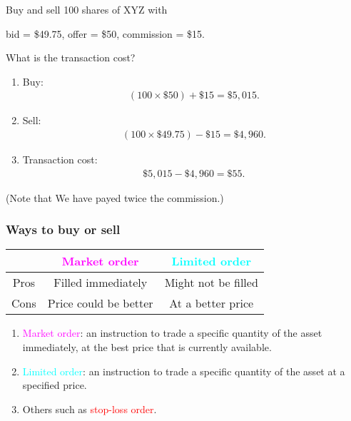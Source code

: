 \begin{frame}[fragile,t]
	\begin{myexample}
		 Buy and sell 100 shares of XYZ with
		 \begin{center}
		 	 bid = \$49.75, \quad  offer = \$50, \quad  commission = \$15.
		 \end{center}
		 What is the transaction cost?
	\end{myexample}
	\bigskip
	\pause

	\begin{mysol}
		\begin{enumerate}
			\item Buy:
				\begin{align*}
					(100 \times \$50) + \$15 = \$5,015.
				\end{align*}
			\item Sell:
				\begin{align*}
					(100 \times \$49.75) - \$15 = \$4,960.
				\end{align*}
			\item Transaction cost:
				\begin{align*}
					 \$5,015 - \$4,960 = \$55.
				\end{align*}
		\end{enumerate}
		(Note that We have payed twice the commission.)
		\myEnd
	\end{mysol}
\end{frame}
\begin{frame}[fragile,t]
	\frametitle{Ways to buy or sell}
	\begin{center}
	\renewcommand{\arraystretch}{1.2}
		\begin{tabular}{c|c|c|}
					 & \textcolor{magenta}{Market order} & \textcolor{cyan}{Limited order} \\ \hline
			Pros & Filled immediately                & Might not be filled             \\
			Cons & Price could be better             & At a better price               \\
		\end{tabular}
	\end{center}
	\bigskip

	\begin{enumerate}
		\item \textcolor{magenta}{Market order}: an instruction to trade a specific quantity of the asset
			immediately, at the best price that is currently available.
			\bigskip

		\item \textcolor{cyan}{Limited order}: an instruction to trade a specific quantity of the asset
			at a specified price.
			\bigskip

		\item Others such as \textcolor{red}{stop-loss order}.
	\end{enumerate}
\end{frame}
